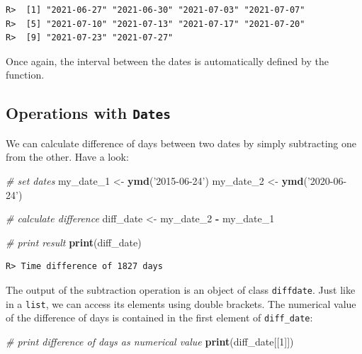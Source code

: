 \documentclass[
  12pt,
]{book}
\newenvironment{Shaded}{\begin{snugshade}}{\end{snugshade}}
\newcommand{\CommentTok}[1]{\textcolor[rgb]{0.37,0.37,0.37}{\textit{#1}}}
\newcommand{\DecValTok}[1]{\textcolor[rgb]{0.06,0.06,0.06}{#1}}
\newcommand{\KeywordTok}[1]{\textcolor[rgb]{0.27,0.27,0.27}{\textbf{#1}}}
\newcommand{\NormalTok}[1]{#1}
\newcommand{\OperatorTok}[1]{\textcolor[rgb]{0.43,0.43,0.43}{\textbf{#1}}}
\newcommand{\StringTok}[1]{\textcolor[rgb]{0.5,0.5,0.5}{#1}}
\begin{document}
\begin{verbatim}
R>  [1] "2021-06-27" "2021-06-30" "2021-07-03" "2021-07-07"
R>  [5] "2021-07-10" "2021-07-13" "2021-07-17" "2021-07-20"
R>  [9] "2021-07-23" "2021-07-27"
\end{verbatim}

Once again, the interval between the dates is automatically defined by the function.

\hypertarget{operations-with-dates}{%
\subsection{\texorpdfstring{Operations with \texttt{Dates}}{Operations with Dates}}\label{operations-with-dates}}

We can calculate difference of days between two dates by simply subtracting one from the other. Have a look:

\begin{Shaded}
\begin{Highlighting}[]
\CommentTok{# set dates}
\NormalTok{my_date_}\DecValTok{1}\NormalTok{ <-}\StringTok{ }\KeywordTok{ymd}\NormalTok{(}\StringTok{'2015-06-24'}\NormalTok{)}
\NormalTok{my_date_}\DecValTok{2}\NormalTok{ <-}\StringTok{ }\KeywordTok{ymd}\NormalTok{(}\StringTok{'2020-06-24'}\NormalTok{)}

\CommentTok{# calculate difference}
\NormalTok{diff_date <-}\StringTok{ }\NormalTok{my_date_}\DecValTok{2} \OperatorTok{-}\StringTok{ }\NormalTok{my_date_}\DecValTok{1}

\CommentTok{# print result}
\KeywordTok{print}\NormalTok{(diff_date)}
\end{Highlighting}
\end{Shaded}

\begin{verbatim}
R> Time difference of 1827 days
\end{verbatim}

The output of the subtraction operation is an object of class \texttt{diffdate}. Just like in a \texttt{list}, we can access its elements using double brackets. The numerical value of the difference of days is contained in the first element of \texttt{diff\_date}: 

\begin{Shaded}
\begin{Highlighting}[]
\CommentTok{# print difference of days as numerical value}
\KeywordTok{print}\NormalTok{(diff_date[[}\DecValTok{1}\NormalTok{]])}
\end{Highlighting}
\end{Shaded}
\end{document}
